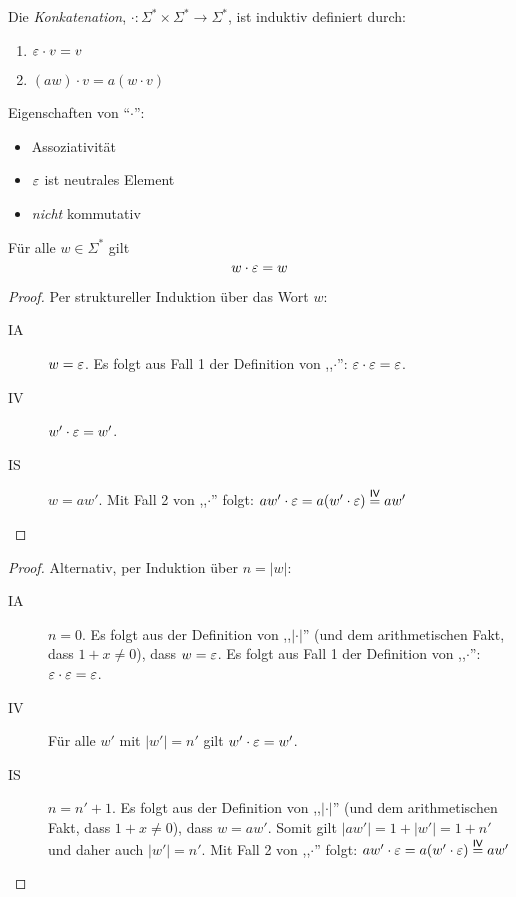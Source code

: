 \begin{Def}
  Die \emph{Konkatenation}, $\mathord{\cdot} : \Sigma^* \times \Sigma^* \to \Sigma^*$, ist induktiv definiert durch:
  \begin{enumerate}
  \item $\varepsilon\cdot v = v$
  \item $(aw)\cdot v = a(w\cdot v)$
  \end{enumerate}
\end{Def}
Eigenschaften von "`$\cdot$"':
\begin{itemize}
\item Assoziativität
\item $\varepsilon$ ist neutrales Element
\item \emph{nicht} kommutativ
\end{itemize}
\begin{lemma}
  Für alle $w \in \Sigma^*$ gilt
  \begin{displaymath}
    w \cdot \varepsilon = w
  \end{displaymath}
\end{lemma}
\begin{proof}
  Per struktureller Induktion über das Wort $w$:
  \begin{description}
  \item[IA] $w = \varepsilon$.
      Es folgt aus Fall 1 der Definition von ,,$\cdot$'': $\varepsilon \cdot \varepsilon = \varepsilon$.
  \item[IV] $w' \cdot \varepsilon = w'$.
  \item[IS] $w = aw'$.
    Mit Fall 2 von ,,$\cdot$'' folgt: $aw' \cdot \varepsilon = a (w' \cdot \varepsilon) \stackrel{\mathsf{IV}}{=} aw'$
  \end{description}
\end{proof}
\begin{proof}
  Alternativ, per Induktion über $n = |w|$:
  \begin{description}
  \item[IA] $n = 0$.
    Es folgt aus der Definition von ,,$|\cdot|$'' (und dem arithmetischen Fakt, dass $1 + x \not = 0$), dass $w = \varepsilon$.
    Es folgt aus Fall 1 der Definition von ,,$\cdot$'': $\varepsilon \cdot \varepsilon = \varepsilon$.
  \item[IV] Für alle $w'$ mit $|w'| = n'$ gilt $w' \cdot \varepsilon = w'$.
  \item[IS] $n = n' + 1$.
    Es folgt aus der Definition von ,,$|\cdot|$'' (und dem arithmetischen Fakt, dass $1 + x \not = 0$), dass $w = aw'$.
    Somit gilt $|aw'| = 1 + |w'| = 1 + n'$ und daher auch $|w'| = n'$.
    Mit Fall 2 von ,,$\cdot$'' folgt: $aw' \cdot \varepsilon = a (w' \cdot \varepsilon) \stackrel{\mathsf{IV}}{=} aw'$
  \end{description}
\end{proof}
